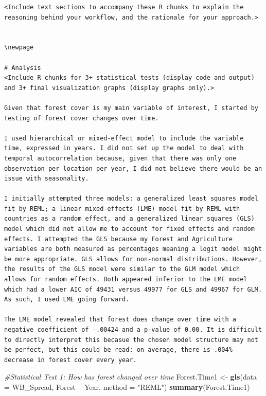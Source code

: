 \documentclass[12pt,]{article}
\newenvironment{Shaded}{\begin{snugshade}}{\end{snugshade}}
\newcommand{\KeywordTok}[1]{\textcolor[rgb]{0.13,0.29,0.53}{\textbf{#1}}}
\newcommand{\DataTypeTok}[1]{\textcolor[rgb]{0.13,0.29,0.53}{#1}}
\newcommand{\StringTok}[1]{\textcolor[rgb]{0.31,0.60,0.02}{#1}}
\newcommand{\CommentTok}[1]{\textcolor[rgb]{0.56,0.35,0.01}{\textit{#1}}}
\newcommand{\OperatorTok}[1]{\textcolor[rgb]{0.81,0.36,0.00}{\textbf{#1}}}
\newcommand{\NormalTok}[1]{#1}
\begin{document}
\begin{verbatim}
<Include text sections to accompany these R chunks to explain the reasoning behind your workflow, and the rationale for your approach.>


\newpage

# Analysis
<Include R chunks for 3+ statistical tests (display code and output) and 3+ final visualization graphs (display graphs only).>

Given that forest cover is my main variable of interest, I started by testing of forest cover changes over time. 

I used hierarchical or mixed-effect model to include the variable time, expressed in years. I did not set up the model to deal with temporal autocorrelation because, given that there was only one observation per location per year, I did not believe there would be an issue with seasonality. 

I initially attempted three models: a generalized least squares model fit by REML; a linear mixed-effects (LME) model fit by REML with countries as a random effect, and a generalized linear squares (GLS) model which did not allow me to account for fixed effects and random effects. I attempted the GLS because my Forest and Agriculture variables are both measured as percentages meaning a logit model might be more appropriate. GLS allows for non-normal distributions. However, the results of the GLS model were similar to the GLM model which allows for random effects. Both appeared inferior to the LME model which had a lower AIC of 49431 versus 49977 for GLS and 49967 for GLM. As such, I used LME going forward. 

The LME model revealed that forest does change over time with a negative coefficient of -.00424 and a p-value of 0.00. It is difficult to directly interpret this becasue the chosen model structure may not be perfect, but this could be read: on average, there is .004% decrease in forest cover every year.
\end{verbatim}

\begin{Shaded}
\begin{Highlighting}[]
\CommentTok{#Statistical Test 1: How has forest changed over time }
\NormalTok{Forest.Time1 <-}\StringTok{ }\KeywordTok{gls}\NormalTok{(}\DataTypeTok{data =}\NormalTok{ WB_Spread, }
\NormalTok{                    Forest }\OperatorTok{~}\StringTok{ }\NormalTok{Year,}
                    \DataTypeTok{method =} \StringTok{"REML"}\NormalTok{)}
\KeywordTok{summary}\NormalTok{(Forest.Time1)}
\end{Highlighting}
\end{Shaded}
\end{document}
